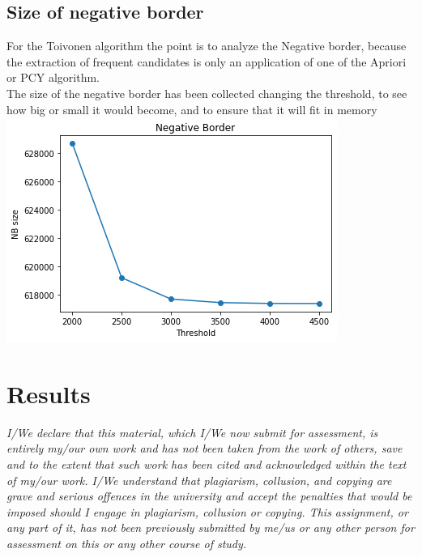 \documentclass[14pt]{extarticle}
\begin{document}
\subsection{Size of negative border}
For the Toivonen algorithm the point is to analyze the Negative border, because the extraction of frequent candidates is only an application of one of the Apriori or PCY algorithm.\\
The size of the negative border has been collected changing the threshold, to see how big or small it would become, and to ensure that it will fit in memory\\
\includegraphics[scale=1]{nb_sizes.png}\\
\section{Results}
{\it I/We declare that this material, which I/We now submit for assessment, is entirely my/our own work and has not been taken from the work of others, save and to the extent that such work has been cited and acknowledged within the text of my/our work. I/We understand that plagiarism, collusion, and copying are grave and serious offences in the university and accept the penalties that would be imposed should I engage in plagiarism, collusion or copying. This assignment, or any part of it, has not been previously submitted by me/us or any other person for assessment on this or any other course of study.}

\end{document}
